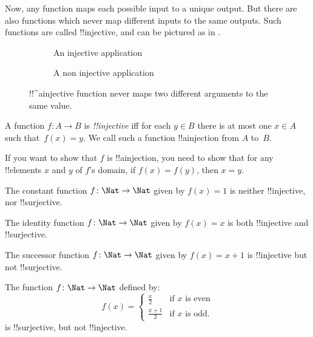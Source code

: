 \documentclass[../../../include/open-logic-section]{subfiles}
\begin{document}
\begin{explain}
Now, any function maps each possible input to a unique output. But
there are also functions which never map different inputs to the same
outputs. Such functions are called !!{injective}, and can be pictured
as in .
\begin{figure}
  \centering
  \begin{subfigure}{0.49\linewidth}
  	\centering
  	\caption{An injective application}
  \end{subfigure}
  \begin{subfigure}{0.49\linewidth}
  	\centering
  	\caption{A non injective application}
  \end{subfigure}
  \caption{!!^a{injective} function never maps two different
    arguments to the same value.}
\end{figure}
\end{explain}

\begin{defn} 
A function $f \colon A \rightarrow B$ is \emph{!!{injective}} iff for
each $y \in B$ there is at most one $x \in A$ such that~$f(x) = y$. We
call such a function !!a{injection} from $A$ to~$B$.
\end{defn}

\begin{explain}
If you want to show that $f$ is !!a{injection}, you need to show that
for any !!{element}s $x$ and $y$ of $f$'s domain, if $f(x)=f(y)$, then
$x=y$. 
\end{explain}

\begin{ex}
The constant function $f\colon \Nat \to \Nat$ given by $f(x) = 1$ is
neither !!{injective}, nor !!{surjective}.

The identity function $f\colon \Nat \to \Nat$ given by $f(x) = x$ is
both !!{injective} and !!{surjective}.

The successor function $f \colon \Nat \to \Nat$ given by $f(x) = x+1$
is !!{injective} but not !!{surjective}.
  
The function $f \colon \Nat \to \Nat$ defined by:
\[
  f(x) =
  \begin{cases}
    \frac{x}{2} & \text{if $x$ is even} \\
    \frac{x+1}{2} & \text{if $x$ is odd.}
  \end{cases}
\]
is !!{surjective}, but not !!{injective}.
\end{ex}
\end{document}
